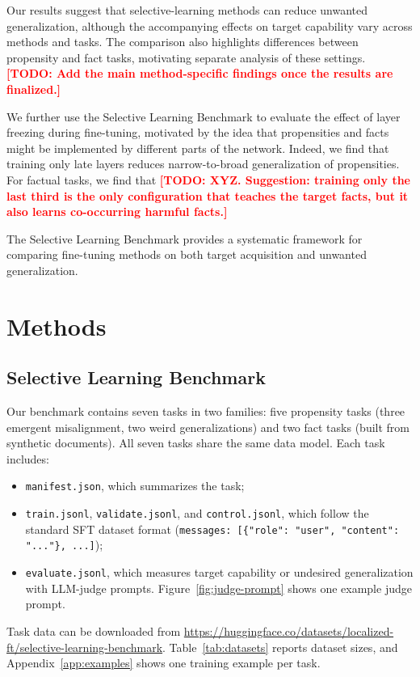 \documentclass[11pt]{article}
\newcommand{\todo}[1]{\textcolor{red}{\textbf{[TODO: #1]}}}
\begin{document}
Our results suggest that selective-learning methods can reduce unwanted generalization, although
the accompanying effects on target capability vary across methods and tasks. The comparison also
highlights differences between propensity and fact tasks, motivating separate analysis of these
settings. \todo{Add the main method-specific findings once the results are finalized.}

We further use the Selective Learning Benchmark to evaluate the effect of layer freezing during
fine-tuning, motivated by the idea that propensities and facts might be implemented by different
parts of the network. Indeed, we find that training only late layers reduces narrow-to-broad
generalization of propensities. For factual tasks, we find that \todo{XYZ. Suggestion: training
only the last third is the only configuration that teaches the target facts, but it also learns
co-occurring harmful facts.}

The Selective Learning Benchmark provides a systematic framework for comparing fine-tuning
methods on both target acquisition and unwanted generalization.

\section{Methods}

\subsection{Selective Learning Benchmark}
\label{sec:benchmark}

Our benchmark contains seven tasks in two families: five propensity tasks (three emergent
misalignment, two weird generalizations) and two fact tasks (built from synthetic documents). All
seven tasks share the same data model. Each task includes:
\begin{itemize}
  \item \texttt{manifest.json}, which summarizes the task;
  \item \texttt{train.jsonl}, \texttt{validate.jsonl}, and \texttt{control.jsonl}, which follow
        the standard SFT dataset format
        (\texttt{messages: [\{"role": "user", "content": "..."\}, ...]});
  \item \texttt{evaluate.jsonl}, which measures target capability or undesired generalization
        with LLM-judge prompts. Figure~\ref{fig:judge-prompt} shows one example judge prompt.
\end{itemize}
Task data can be downloaded from
\url{https://huggingface.co/datasets/localized-ft/selective-learning-benchmark}.
Table~\ref{tab:datasets} reports dataset sizes, and Appendix~\ref{app:examples} shows one
training example per task.
\end{document}

